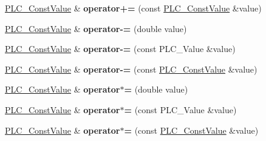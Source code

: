 \begin{DoxyCompactItemize}
\item 
\hypertarget{classns3_1_1PLC__ConstValue_a0e07e4509079110c3dfbf52f1a6273a0}{\hyperlink{classns3_1_1PLC__ConstValue}{\-P\-L\-C\-\_\-\-Const\-Value} \& {\bfseries operator+=} (const \hyperlink{classns3_1_1PLC__ConstValue}{\-P\-L\-C\-\_\-\-Const\-Value} \&value)}\label{classns3_1_1PLC__ConstValue_a0e07e4509079110c3dfbf52f1a6273a0}

\item 
\hypertarget{classns3_1_1PLC__ConstValue_ab32fe71468e611cf97baccbcf495a0a2}{\hyperlink{classns3_1_1PLC__ConstValue}{\-P\-L\-C\-\_\-\-Const\-Value} \& {\bfseries operator-\/=} (double value)}\label{classns3_1_1PLC__ConstValue_ab32fe71468e611cf97baccbcf495a0a2}

\item 
\hypertarget{classns3_1_1PLC__ConstValue_a6dea7512ea708bdb1e373818f5f4606e}{\hyperlink{classns3_1_1PLC__ConstValue}{\-P\-L\-C\-\_\-\-Const\-Value} \& {\bfseries operator-\/=} (const \-P\-L\-C\-\_\-\-Value \&value)}\label{classns3_1_1PLC__ConstValue_a6dea7512ea708bdb1e373818f5f4606e}

\item 
\hypertarget{classns3_1_1PLC__ConstValue_a3ce33d5d52d8c80ca752a238d76822b2}{\hyperlink{classns3_1_1PLC__ConstValue}{\-P\-L\-C\-\_\-\-Const\-Value} \& {\bfseries operator-\/=} (const \hyperlink{classns3_1_1PLC__ConstValue}{\-P\-L\-C\-\_\-\-Const\-Value} \&value)}\label{classns3_1_1PLC__ConstValue_a3ce33d5d52d8c80ca752a238d76822b2}

\item 
\hypertarget{classns3_1_1PLC__ConstValue_ab506917d53f7831c4b319cf1cefc6e66}{\hyperlink{classns3_1_1PLC__ConstValue}{\-P\-L\-C\-\_\-\-Const\-Value} \& {\bfseries operator$\ast$=} (double value)}\label{classns3_1_1PLC__ConstValue_ab506917d53f7831c4b319cf1cefc6e66}

\item 
\hypertarget{classns3_1_1PLC__ConstValue_a8dda1c56f8f9dba07409cb0f239a5c6a}{\hyperlink{classns3_1_1PLC__ConstValue}{\-P\-L\-C\-\_\-\-Const\-Value} \& {\bfseries operator$\ast$=} (const \-P\-L\-C\-\_\-\-Value \&value)}\label{classns3_1_1PLC__ConstValue_a8dda1c56f8f9dba07409cb0f239a5c6a}

\item 
\hypertarget{classns3_1_1PLC__ConstValue_a466341381053a662fad0c5a1e7d3487d}{\hyperlink{classns3_1_1PLC__ConstValue}{\-P\-L\-C\-\_\-\-Const\-Value} \& {\bfseries operator$\ast$=} (const \hyperlink{classns3_1_1PLC__ConstValue}{\-P\-L\-C\-\_\-\-Const\-Value} \&value)}\label{classns3_1_1PLC__ConstValue_a466341381053a662fad0c5a1e7d3487d}


\end{DoxyCompactItemize}
